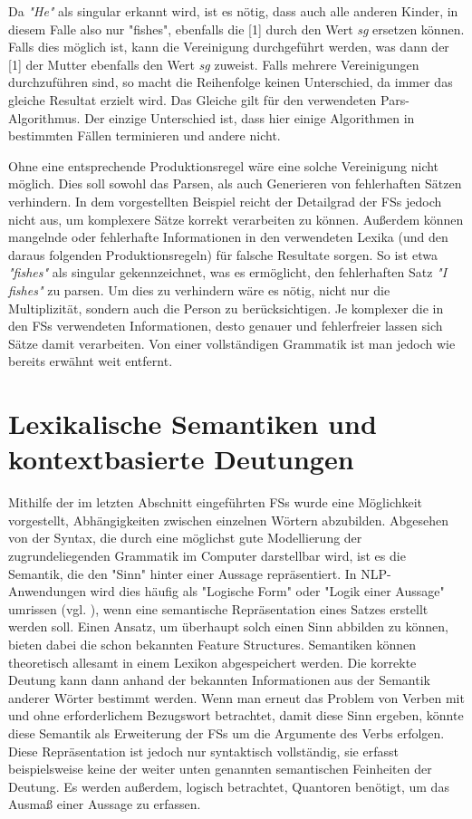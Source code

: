 \documentclass[12pt]{report}
\begin{document}
Da \textit{"He"} als singular erkannt wird, ist es nötig, dass auch alle anderen Kinder, in diesem Falle also nur "fishes", ebenfalls die [1] durch den Wert \textit{sg} ersetzen können. Falls dies möglich ist, kann die Vereinigung durchgeführt werden, was dann der [1] der Mutter ebenfalls den Wert \textit{sg} zuweist. Falls mehrere Vereinigungen durchzuführen sind, so macht die Reihenfolge keinen Unterschied, da immer das gleiche Resultat erzielt wird. Das Gleiche gilt für den verwendeten Pars-Algorithmus. Der einzige Unterschied ist, dass hier einige Algorithmen in bestimmten Fällen terminieren und andere nicht. 

Ohne eine entsprechende Produktionsregel wäre eine solche Vereinigung nicht möglich. Dies soll sowohl das Parsen, als auch Generieren von fehlerhaften Sätzen verhindern. In dem vorgestellten Beispiel reicht der Detailgrad der FSs jedoch nicht aus, um komplexere Sätze korrekt verarbeiten zu können.
Außerdem können mangelnde oder fehlerhafte Informationen in den verwendeten Lexika (und den daraus folgenden Produktionsregeln) für falsche Resultate sorgen. So ist etwa \textit{"fishes"} als singular gekennzeichnet, was es ermöglicht, den fehlerhaften Satz \textit{"I fishes"} zu parsen. Um dies zu verhindern wäre es nötig, nicht nur die Multiplizität, sondern auch die Person zu berücksichtigen. Je komplexer die in den FSs verwendeten Informationen, desto genauer und fehlerfreier lassen sich Sätze damit verarbeiten. Von einer vollständigen Grammatik ist man jedoch wie bereits erwähnt weit entfernt. 

\section{Lexikalische Semantiken und kontextbasierte Deutungen}
Mithilfe der im letzten Abschnitt eingeführten FSs wurde eine Möglichkeit vorgestellt, Abhängigkeiten zwischen einzelnen Wörtern abzubilden. Abgesehen von der Syntax, die durch eine möglichst gute Modellierung der zugrundeliegenden Grammatik im Computer darstellbar wird, ist es die Semantik, die den "Sinn" hinter einer Aussage repräsentiert. In NLP-Anwendungen wird dies häufig als "Logische Form" oder "Logik einer Aussage" umrissen (vgl. \cite{swb02}), wenn eine semantische Repräsentation eines Satzes erstellt werden soll. Einen Ansatz, um überhaupt solch einen Sinn abbilden zu können, bieten dabei die schon bekannten Feature Structures. Semantiken können theoretisch allesamt in einem Lexikon abgespeichert werden. Die korrekte Deutung kann dann anhand der bekannten Informationen aus der Semantik anderer Wörter bestimmt werden. Wenn man erneut das Problem von Verben mit und ohne erforderlichem Bezugswort betrachtet, damit diese Sinn ergeben, könnte diese Semantik als Erweiterung der FSs um die Argumente des Verbs erfolgen. Diese Repräsentation ist jedoch nur syntaktisch vollständig, sie erfasst beispielsweise keine der weiter unten genannten semantischen Feinheiten der Deutung. Es werden außerdem, logisch betrachtet, Quantoren benötigt, um das Ausmaß einer Aussage zu erfassen.
\end{document}
